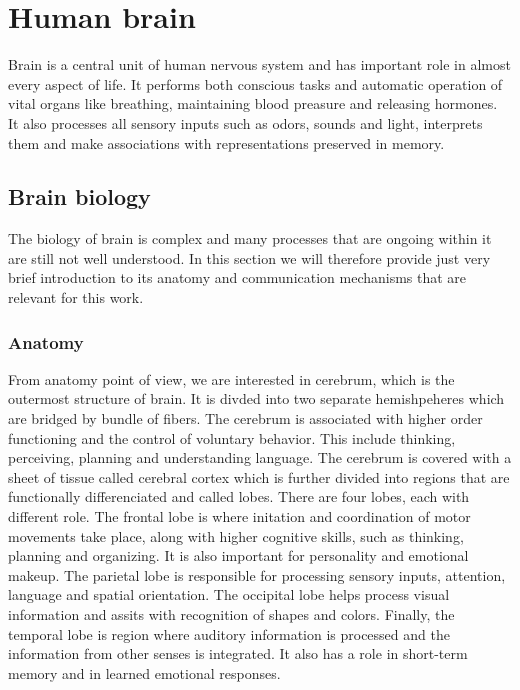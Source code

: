 \chapter{Human brain}
Brain is a central unit of human nervous system and has important role in almost
every aspect of life. It performs both conscious tasks and automatic operation
of vital organs like breathing, maintaining blood preasure and releasing
hormones. It also processes all sensory inputs such as odors, sounds and light,
interprets them and make associations with representations preserved in memory.
\section{Brain biology}
The biology of brain is complex and many processes that are ongoing within it
are still not well understood. In this section we will therefore provide just
very brief introduction to its anatomy and communication mechanisms that are
relevant for this work.
\subsection{Anatomy}
From anatomy point of view, we are interested in cerebrum, which is the
outermost structure of brain. It is divded into two separate hemishpeheres which
are bridged by bundle of fibers. The cerebrum is associated with higher
order functioning and the control of voluntary behavior. This include thinking,
perceiving, planning and understanding language. The cerebrum is covered with a
sheet of tissue called cerebral cortex which is further divided into regions
that are functionally differenciated and called lobes. There are four lobes,
each with different role. The frontal lobe is where initation and coordination of
motor movements take place, along with higher cognitive skills, such as
thinking, planning and organizing. It is also important for personality and
emotional makeup. The parietal lobe is responsible for processing sensory
inputs, attention, language and spatial orientation. The occipital lobe helps
process visual information and assits with recognition of shapes and colors.
Finally, the temporal lobe is region where auditory information is processed and the
information from other senses is integrated. It also has a role in short-term
memory and in learned emotional responses. \cite{brainFacts}
